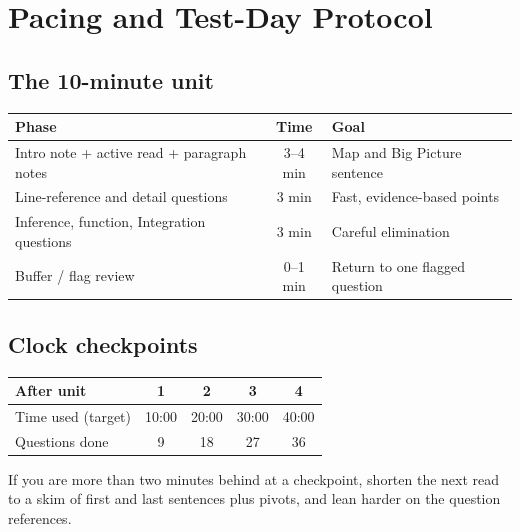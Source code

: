 \documentclass[11pt]{article}
\begin{document}
\section{Pacing and Test-Day Protocol}

\subsection{The 10-minute unit}
\begin{center}
\small
\begin{tabular}{@{}lcl@{}}
\toprule
\textbf{Phase} & \textbf{Time} & \textbf{Goal}\\
\midrule
Intro note + active read + paragraph notes & 3--4 min & Map and Big Picture sentence\\
Line-reference and detail questions & 3 min & Fast, evidence-based points\\
Inference, function, Integration questions & 3 min & Careful elimination\\
Buffer / flag review & 0--1 min & Return to one flagged question\\
\bottomrule
\end{tabular}
\end{center}

\subsection{Clock checkpoints}
\begin{center}
\small
\begin{tabular}{@{}lcccc@{}}
\toprule
\textbf{After unit} & 1 & 2 & 3 & 4\\
\midrule
Time used (target) & 10:00 & 20:00 & 30:00 & 40:00\\
Questions done & 9 & 18 & 27 & 36\\
\bottomrule
\end{tabular}
\end{center}
If you are more than two minutes behind at a checkpoint, shorten the next read to a skim of first and last sentences plus pivots, and lean harder on the question references.
\end{document}
